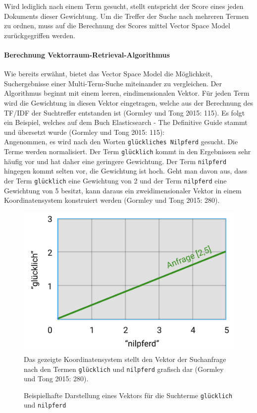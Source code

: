 \documentclass[a4paper]{scrartcl}
\begin{document}
Wird lediglich nach einem Term gesucht, stellt entspricht der Score eines jeden Dokuments dieser Gewichtung. Um die Treffer der Suche nach mehreren Termen zu ordnen, muss auf die Berechnung des Scores mittel Vector Space Model zurückgegriffen werden.

\paragraph{Berechnung Vektorraum-Retrieval-Algorithmus}
Wie bereits erwähnt, bietet das Vector Space Model die Möglichkeit, Suchergebnisse einer Multi-Term-Suche miteinander zu vergleichen. Der Algorithmus beginnt mit einem leeren, eindimensionalen Vektor. Für jeden Term wird die Gewichtung in diesen Vektor eingetragen, welche aus der Berechnung des TF/IDF der Suchtreffer entstanden ist (Gormley und Tong 2015: 115). Es folgt ein Beispiel, welches auf dem Buch Elasticsearch - The Definitive Guide stammt und übersetzt wurde (Gormley und Tong 2015: 115): \\

Angenommen, es wird nach den Worten \texttt{glückliches Nilpferd} gesucht. Die Terme werden normalisiert. Der Term \texttt{glücklich} kommt in den Ergebnissen sehr häufig vor und hat daher eine geringere Gewichtung. Der Term \texttt{nilpferd} hingegen kommt selten vor, die Gewichtung ist hoch. Geht man davon aus, dass der Term \texttt{glücklich} eine Gewichtung von 2 und der Term \texttt{nilpferd} eine Gewichtung von 5 besitzt, kann daraus ein zweidimensionaler Vektor in einem Koordinatensystem konstruiert werden (Gormley und Tong 2015: 280).

\begin{figure}[h!]
	\centering
	\caption{Beispielhafte Darstellung eines Vektors für die Suchterme \texttt{glücklich} und \texttt{nilpferd}}
	\includegraphics[scale=0.35]{assets/Diagram_1} \\
	Das gezeigte Koordinatensystem stellt den Vektor der Suchanfrage nach den Termen \texttt{glücklich} und \texttt{nilpferd} grafisch dar (Gormley und Tong 2015: 280).
\end{figure}
\end{document}
